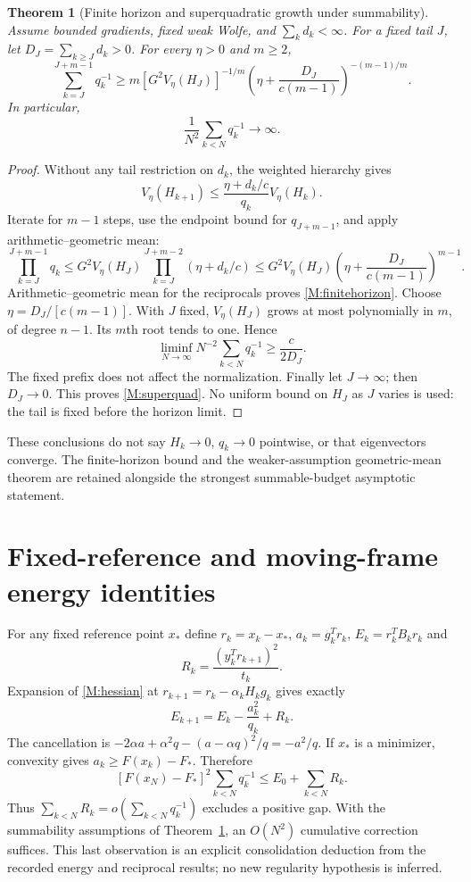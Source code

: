 \documentclass[10pt,oneside,openany]{book}
\newtheorem{theorem}{Theorem}[chapter]
\theoremstyle{remark}\newtheorem{remark}{Remark}[chapter]
\begin{document}
\begin{theorem}[Finite horizon and superquadratic growth under summability]\label{M:superquadratic}
Assume bounded gradients, fixed weak Wolfe, and $\sum_kd_k<\infty$. For a fixed tail $J$, let $D_J=\sum_{k\ge J}d_k>0$. For every $\eta>0$ and $m\ge2$,
\begin{equation}\label{M:finitehorizon}
 \sum_{k=J}^{J+m-1}q_k^{-1}\ge
 m[G^2V_\eta(H_J)]^{-1/m}
 \left(\eta+\frac{D_J}{c(m-1)}\right)^{-(m-1)/m}.
\end{equation}
In particular,
\begin{equation}\label{M:superquad}
 \frac1{N^2}\sum_{k<N}q_k^{-1}\longrightarrow\infty.
\end{equation}
\end{theorem}
\begin{proof}
Without any tail restriction on $d_k$, the weighted hierarchy gives
\[
 V_\eta(H_{k+1})\le\frac{\eta+d_k/c}{q_k}V_\eta(H_k).
\]
Iterate for $m-1$ steps, use the endpoint bound for $q_{J+m-1}$, and apply arithmetic--geometric mean:
\[
 \prod_{k=J}^{J+m-1}q_k
 \le G^2V_\eta(H_J)\prod_{k=J}^{J+m-2}(\eta+d_k/c)
 \le G^2V_\eta(H_J)\left(\eta+\frac{D_J}{c(m-1)}\right)^{m-1}.
\]
Arithmetic--geometric mean for the reciprocals proves \eqref{M:finitehorizon}. Choose $\eta=D_J/[c(m-1)]$. With $J$ fixed, $V_\eta(H_J)$ grows at most polynomially in $m$, of degree $n-1$. Its $m$th root tends to one. Hence
\[
 \liminf_{N\to\infty}N^{-2}\sum_{k<N}q_k^{-1}\ge \frac{c}{2D_J}.
\]
The fixed prefix does not affect the normalization. Finally let $J\to\infty$; then $D_J\to0$. This proves \eqref{M:superquad}. No uniform bound on $H_J$ as $J$ varies is used: the tail is fixed before the horizon limit.
\end{proof}
These conclusions do not say $H_k\to0$, $q_k\to0$ pointwise, or that eigenvectors converge. The finite-horizon bound and the weaker-assumption geometric-mean theorem are retained alongside the strongest summable-budget asymptotic statement.

\section{Fixed-reference and moving-frame energy identities}
\label{M:energy}
For any fixed reference point $x_*$ define $r_k=x_k-x_*$, $a_k=g_k^Tr_k$, $E_k=r_k^TB_kr_k$ and
\[
 R_k=\frac{(y_k^Tr_{k+1})^2}{t_k}.
\]
Expansion of \eqref{M:hessian} at $r_{k+1}=r_k-\alpha_kH_kg_k$ gives exactly
\begin{equation}\label{M:fixedenergy}
 E_{k+1}=E_k-\frac{a_k^2}{q_k}+R_k.
\end{equation}
The cancellation is $-2\alpha a+\alpha^2q-(a-\alpha q)^2/q=-a^2/q$. If $x_*$ is a minimizer, convexity gives $a_k\ge F(x_k)-F_*$. Therefore
\begin{equation}\label{M:energybound}
 [F(x_N)-F_*]^2\sum_{k<N}q_k^{-1}\le E_0+\sum_{k<N}R_k.
\end{equation}
Thus $\sum_{k<N}R_k=o(\sum_{k<N}q_k^{-1})$ excludes a positive gap. With the summability assumptions of Theorem~\ref{M:superquadratic}, an $O(N^2)$ cumulative correction suffices. This last observation is an explicit consolidation deduction from the recorded energy and reciprocal results; no new regularity hypothesis is inferred.
\end{document}
